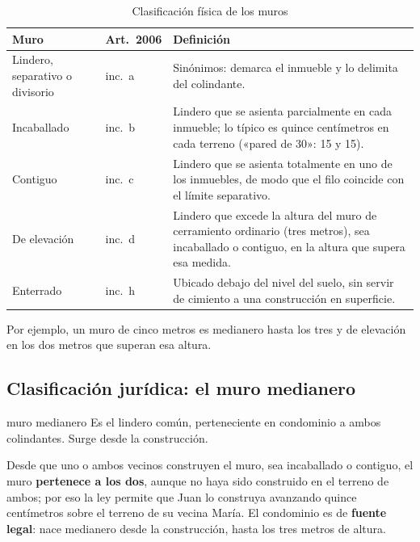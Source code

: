 \documentclass[12pt,oneside]{book}
\begin{document}
\begin{table}[H]
\centering
\small
\begin{tabularx}{\textwidth}{>{\raggedright\arraybackslash}p{}>{\raggedright\arraybackslash}p{}>{\raggedright\arraybackslash}X}
\toprule
\textbf{Muro} & \textbf{Art.~2006} & \textbf{Definición} \\
\midrule
Lindero, separativo o divisorio & inc.~a & Sinónimos: demarca el inmueble y lo delimita del colindante. \\
Incaballado & inc.~b & Lindero que se asienta parcialmente en cada inmueble; lo típico es quince centímetros en cada terreno («pared de 30»: 15 y 15). \\
Contiguo & inc.~c & Lindero que se asienta totalmente en uno de los inmuebles, de modo que el filo coincide con el límite separativo. \\
De elevación & inc.~d & Lindero que excede la altura del muro de cerramiento ordinario (tres metros), sea incaballado o contiguo, en la altura que supera esa medida. \\
Enterrado & inc.~h & Ubicado debajo del nivel del suelo, sin servir de cimiento a una construcción en superficie. \\
\bottomrule
\end{tabularx}
\caption{Clasificación física de los muros}
\end{table}

Por ejemplo, un muro de cinco metros es medianero hasta los tres y de elevación en los dos metros que superan esa altura.

\subsection{Clasificación jurídica: el muro medianero}

\begin{definicion}{muro medianero}
Es el lindero común, perteneciente en condominio a ambos colindantes. Surge desde la construcción.
\end{definicion}

Desde que uno o ambos vecinos construyen el muro, sea incaballado o contiguo, el muro \textbf{pertenece a los dos}, aunque no haya sido construido en el terreno de ambos; por eso la ley permite que Juan lo construya avanzando quince centímetros sobre el terreno de su vecina María. El condominio es de \textbf{fuente legal}: nace medianero desde la construcción, hasta los tres metros de altura.
\end{document}
